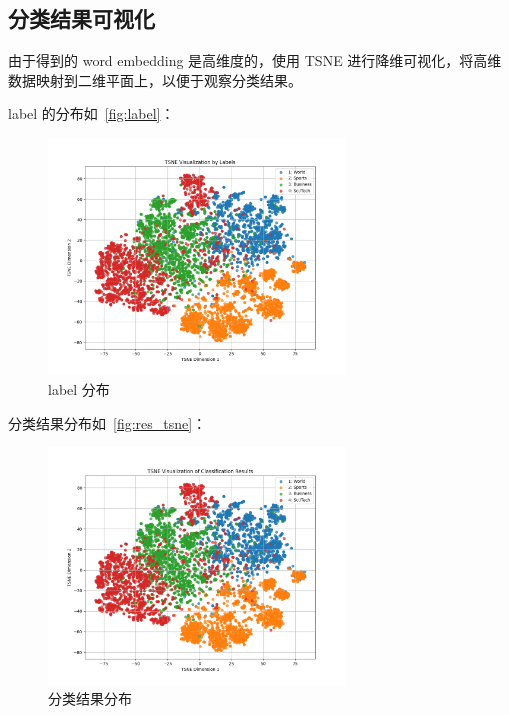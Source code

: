 \subsection{分类结果可视化}

由于得到的 word embedding 是高维度的，使用 TSNE 进行降维可视化，将高维数据映射到二维平面上，以便于观察分类结果。

label 的分布如~\autoref{fig:label}：\begin{figure}[htbp]
    \centering
    \includegraphics[width=0.7\textwidth]{images/label_tsne.png}
    \caption{label 分布}
    \label{fig:label}
\end{figure}

分类结果分布如~\autoref{fig:res_tsne}：\begin{figure}[htbp]
    \centering
    \includegraphics[width=0.7\textwidth]{images/classification_tsne.png}
    \caption{分类结果分布}
    \label{fig:res_tsne}
\end{figure}


